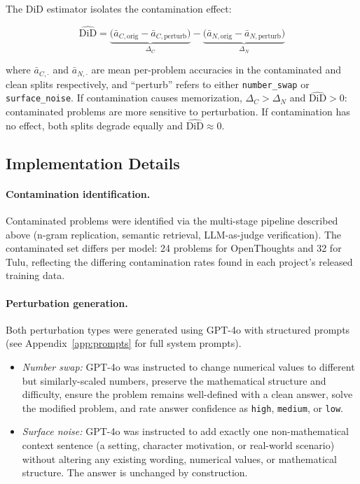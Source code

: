 \documentclass{article} %
\newcommand{\did}{\widehat{\text{DiD}}}
\begin{document}
The DiD estimator isolates the contamination effect:

\begin{equation}
  \did
    = \underbrace{\bigl(\bar{a}_{C,\text{orig}} - \bar{a}_{C,\text{perturb}}\bigr)}_{\Delta_C}
    - \underbrace{\bigl(\bar{a}_{N,\text{orig}} - \bar{a}_{N,\text{perturb}}\bigr)}_{\Delta_N}
  \label{eq:did}
\end{equation}

\noindent where $\bar{a}_{C,\cdot}$ and $\bar{a}_{N,\cdot}$ are mean per-problem accuracies in the contaminated and clean splits respectively, and ``perturb'' refers to either \texttt{number\_swap} or \texttt{surface\_noise}. If contamination causes memorization, $\Delta_C > \Delta_N$ and $\did > 0$: contaminated problems are more sensitive to perturbation. If contamination has no effect, both splits degrade equally and $\did \approx 0$.

\subsection{Implementation Details}

\paragraph{Contamination identification.}
Contaminated problems were identified via the multi-stage pipeline described above (n-gram replication, semantic retrieval, LLM-as-judge verification). The contaminated set differs per model: 24 problems for OpenThoughts and 32 for Tulu, reflecting the differing contamination rates found in each project's released training data.

\paragraph{Perturbation generation.}
Both perturbation types were generated using GPT-4o with structured prompts (see Appendix~\ref{app:prompts} for full system prompts).

\begin{itemize}[leftmargin=*]
  \item \emph{Number swap:} GPT-4o was instructed to change numerical values to different but similarly-scaled numbers, preserve the mathematical structure and difficulty, ensure the problem remains well-defined with a clean answer, solve the modified problem, and rate answer confidence as \texttt{high}, \texttt{medium}, or \texttt{low}. 
  \item \emph{Surface noise:} GPT-4o was instructed to add exactly one non-mathematical context sentence (a setting, character motivation, or real-world scenario) without altering any existing wording, numerical values, or mathematical structure. The answer is unchanged by construction.
\end{itemize}
\end{document}
